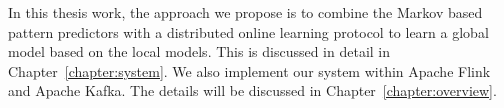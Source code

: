 \par In this thesis work, the approach we propose is to combine the Markov based pattern predictors \cite{alevizos2017event} with a distributed online learning protocol \cite{kamp2014communication} to learn a global model based on the local models. This is discussed in detail in Chapter~\ref{chapter:system}. We also implement our system within Apache Flink and Apache Kafka. The details will be discussed in Chapter~\ref{chapter:overview}.
%
%
%
%
%
%
